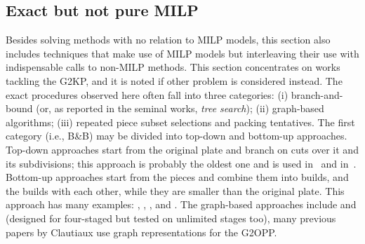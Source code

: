 \documentclass[ppgc,tese,english,formais,babel]{iiufrgs}
\begin{document}
\subsection{Exact but not pure MILP}

Besides solving methods with no relation to MILP models, this section also includes techniques that make use of MILP models but interleaving their use with indispensable calls to non-MILP methods.
This section concentrates on works tackling the G2KP, and it is noted if other problem is considered instead.
The exact procedures observed here often fall into three categories: (i) branch-and-bound (or, as reported in the seminal works, \emph{tree search}); (ii) graph-based algorithms; (iii) repeated piece subset selections and packing tentatives.
The first category (i.e., B\&B) may be divided into top-down and bottom-up approaches.
Top-down approaches start from the original plate and branch on cuts over it and its subdivisions; this approach is probably the oldest one and is used in~\citet{cw:1977} and in~\citet{nicos:1995:ssr}.
Bottom-up approaches start from the pieces and combine them into builds, and the builds with each other, while they are smaller than the original plate. This approach has many examples: \citet{bagchi:1993}, \citet{hifi:1997}, \citet{cung:2000}, and \citet{yoon:2013}.
The graph-based approaches include \citet{morabito:1996} and \citet{clautiaux:2018} (designed for four-staged but tested on unlimited stages too), many previous papers by Clautiaux use graph representations for the G2OPP.
\end{document}
